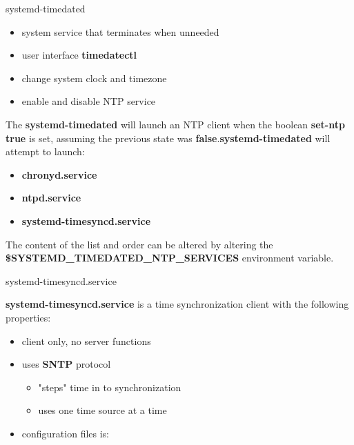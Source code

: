 \begin{frame} 
	{systemd-timedated}

	\begin{itemize} 
		\item  system service that terminates when unneeded
		\item  user interface \textbf{timedatectl}
		\item  change system clock and timezone 
		\item  enable and disable NTP service 
	\end{itemize}

	The \textbf{systemd-timedated} will launch an NTP client when the 
	boolean \textbf{set-ntp true} is set, assuming the previous state 
	was \textbf{false}.\textbf{systemd-timedated} will attempt to launch:
	\begin{itemize} 
		\item \textbf{chronyd.service}
		\item \textbf{ntpd.service} 
		\item \textbf{systemd-timesyncd.service}
	\end{itemize}

	The content of the list and order can be altered by altering the \\
	\textbf{\$SYSTEMD\_TIMEDATED\_NTP\_SERVICES} environment variable. 

\end{frame}

\cprotect\note{

	}


\begin{frame}
	{systemd-timesyncd.service}

	\textbf{systemd-timesyncd.service} is a time synchronization 
	client with the following properties: 
	\begin{itemize}
		\item client only, no server functions
		\item uses \textbf{SNTP} protocol
			\begin{itemize}
				\item "steps" time in to synchronization
				\item uses one time source at a time
			\end{itemize}
		\item configuration files is: 
	\end{itemize} 

\end{frame}

